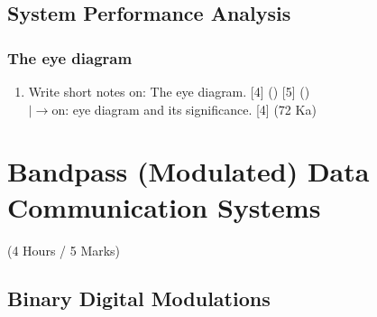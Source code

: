 \documentclass[12pt]{article}
\newcommand{\lb}{\\$\left|\rightarrow\right.$}
\begin{document}
  \subsection{System Performance Analysis}
    \subsubsection{The eye diagram}
    	\begin{enumerate}
    		\item Write short notes on: The eye diagram. \hfill [4] () [5] ()
    		\lb on: eye diagram and its significance. \hfill [4] (72 Ka)
    	\end{enumerate}

\pagebreak

\section{Bandpass (Modulated) Data Communication Systems}
  \begin{center}(4 Hours / 5 Marks)\end{center}

  \subsection{Binary Digital Modulations}
\end{document}
